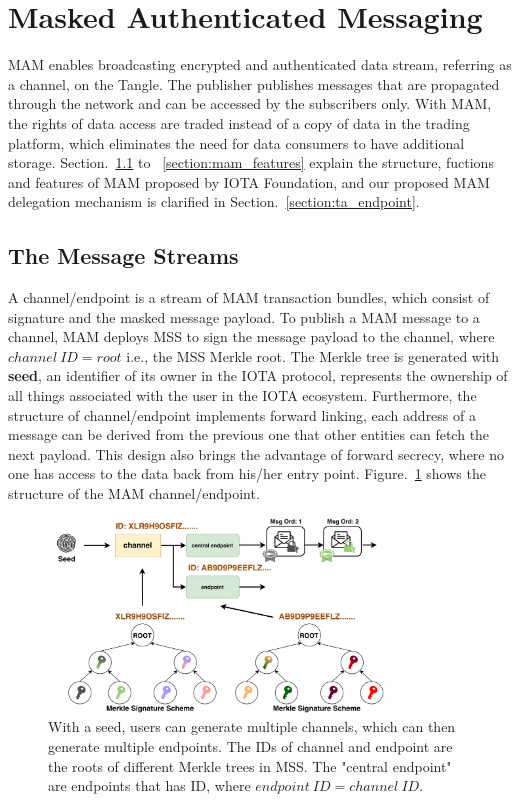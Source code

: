 \documentclass[conference]{IEEEtran}
\begin{document}
\section{Masked Authenticated Messaging}
\label{section:MAM}
MAM enables broadcasting encrypted and authenticated data stream, referring as a channel, on the Tangle. The publisher publishes messages that are propagated through the network and can be accessed by the subscribers only. With MAM, the rights of data access are traded instead of a copy of data in the trading platform, which eliminates the need for data consumers to have additional storage.
Section.~\ref{section:mam_streams} to ~\ref{section:mam_features} explain the structure, fuctions and features of MAM proposed by IOTA Foundation, and our proposed MAM delegation mechanism is clarified in Section.~\ref{section:ta_endpoint}.

\subsection{The Message Streams}
\label{section:mam_streams}
A channel/endpoint is a stream of MAM transaction bundles, which consist of signature and the masked message payload. To publish a MAM message to a channel, MAM deploys MSS to sign the message payload to the channel, where $channel\ ID = root$ i.e., the MSS Merkle root. The Merkle tree is generated with \textbf{seed}, an identifier of its owner in the IOTA protocol, represents the ownership of all things associated with the user in the IOTA ecosystem. Furthermore, the structure of channel/endpoint implements forward linking, each address of a message can be derived from the previous one that other entities can fetch the next payload. This design also brings the advantage of forward secrecy, where no one has access to the data back from his/her entry point. Figure.~\ref{fig:mam_structure} shows the structure of the MAM channel/endpoint.

\begin{figure}[h]
    \centering
    \includegraphics[width=3.5in]{mam_structure}
    \caption{With a seed, users can generate multiple channels, which can then generate multiple endpoints. The IDs of channel and endpoint are the roots of different Merkle trees in MSS. The "central endpoint" are endpoints that has ID, where $endpoint\ ID = channel\ ID$.}
    \label{fig:mam_structure}
\end{figure}
\end{document}
